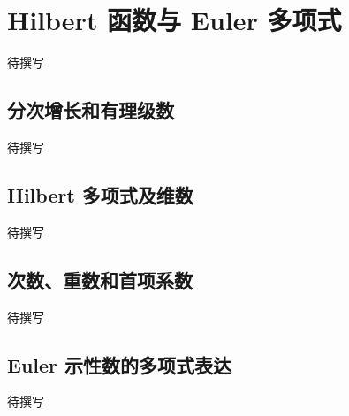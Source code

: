 
% 
% 

\section{Hilbert 函数与 Euler 多项式}
\label{g5:sec:1903}

待撰写

\subsection{分次增长和有理级数}
\label{g5:subsec:1903:01}
待撰写

\subsection{Hilbert 多项式及维数}
\label{g5:subsec:1903:02}
待撰写

\subsection{次数、重数和首项系数}
\label{g5:subsec:1903:03}
待撰写

\subsection{Euler 示性数的多项式表达}
\label{g5:subsec:1903:04}
待撰写
